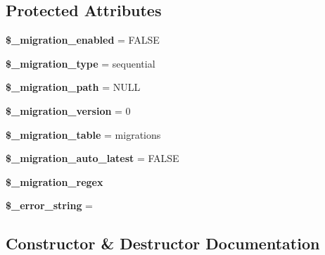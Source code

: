 \subsection*{Protected Attributes}
\begin{DoxyCompactItemize}
\item 
\mbox{\label{class_c_i___migration_a12ce2b043f04ec9412e07dd7955a91be}} 
{\bfseries \$\+\_\+migration\+\_\+enabled} = F\+A\+L\+SE
\item 
\mbox{\label{class_c_i___migration_a39a6822a7b085dda969bcc4c3900e206}} 
{\bfseries \$\+\_\+migration\+\_\+type} = \textquotesingle{}sequential\textquotesingle{}
\item 
\mbox{\label{class_c_i___migration_ae967c0ff974808b60d0511f21dc09138}} 
{\bfseries \$\+\_\+migration\+\_\+path} = N\+U\+LL
\item 
\mbox{\label{class_c_i___migration_a91ad5b3a5b1b31b3ac6af0f96da631b7}} 
{\bfseries \$\+\_\+migration\+\_\+version} = 0
\item 
\mbox{\label{class_c_i___migration_a4190025540b466653db53e42ed50a4d0}} 
{\bfseries \$\+\_\+migration\+\_\+table} = \textquotesingle{}migrations\textquotesingle{}
\item 
\mbox{\label{class_c_i___migration_a6ab20374a0d46bb6592d91e2330ca09a}} 
{\bfseries \$\+\_\+migration\+\_\+auto\+\_\+latest} = F\+A\+L\+SE
\item 
\mbox{\label{class_c_i___migration_a578168db74b6f2964cba31635b75b038}} 
{\bfseries \$\+\_\+migration\+\_\+regex}
\item 
\mbox{\label{class_c_i___migration_ad4fc6df7b4edda9b2f51925a87e78f11}} 
{\bfseries \$\+\_\+error\+\_\+string} = \textquotesingle{}\textquotesingle{}
\end{DoxyCompactItemize}


\subsection{Constructor \& Destructor Documentation}
\mbox{\label{class_c_i___migration_ad6c4930b6bb3a657adde8f8b8f0746d6}} 
